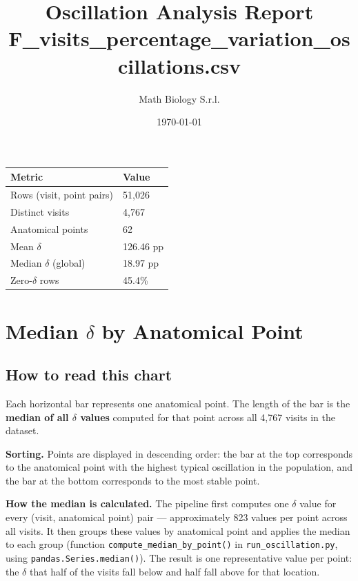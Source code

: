 \documentclass[11pt,a4paper]{article}
\title{%
  \textcolor{mathdark}{\textbf{Oscillation Analysis Report}}\\[4pt]
  \large F\_visits\_percentage\_variation\_oscillations.csv}
\author{Math Biology S.r.l.}
\date{\today}
\begin{document}
\maketitle
\tableofcontents
\bigskip

\noindent
\begin{tabular}{@{}ll@{}}
\toprule
\textbf{Metric} & \textbf{Value} \\
\midrule
Rows (visit, point pairs) & 51,026 \\
Distinct visits           & 4,767 \\
Anatomical points         & 62 \\
Mean $\delta$             & 126.46 pp \\
Median $\delta$ (global)  & 18.97 pp \\
Zero-$\delta$ rows        & 45.4\% \\
\bottomrule
\end{tabular}

\newpage

\section{Median \texorpdfstring{$\delta$}{delta} by Anatomical Point}

\subsection*{How to read this chart}

Each horizontal bar represents one anatomical point.
The length of the bar is the \textbf{median of all $\delta$ values} computed for
that point across all 4,767 visits in the dataset.

\textbf{Sorting.}
Points are displayed in descending order: the bar at the top corresponds to the
anatomical point with the highest typical oscillation in the population, and the
bar at the bottom corresponds to the most stable point.

\textbf{How the median is calculated.}
The pipeline first computes one $\delta$ value for every (visit, anatomical point)
pair --- approximately 823 values per
point across all visits.
It then groups these values by anatomical point and applies the median to each
group (function \texttt{compute\_median\_by\_point()} in
\texttt{run\_oscillation.py}, using \texttt{pandas.Series.median()}).
The result is one representative value per point: the $\delta$ that half of
the visits fall below and half fall above for that location.
\end{document}
